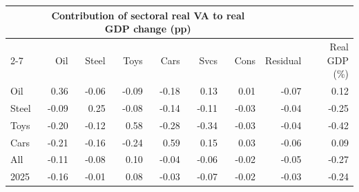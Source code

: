 \begin{tabular}{lrrrrrrrr}
\toprule
 & \multicolumn{6}{c}{Contribution of sectoral real VA to real GDP change (pp)} & & \\
\cmidrule(lr){2-7}
 & Oil & Steel & Toys & Cars & Svcs & Cons & Residual & Real GDP (\%) \\
\midrule
Oil & 0.36 & -0.06 & -0.09 & -0.18 & 0.13 & 0.01 & -0.07 & 0.12 \\
Steel & -0.09 & 0.25 & -0.08 & -0.14 & -0.11 & -0.03 & -0.04 & -0.25 \\
Toys & -0.20 & -0.12 & 0.58 & -0.28 & -0.34 & -0.03 & -0.04 & -0.42 \\
Cars & -0.21 & -0.16 & -0.24 & 0.59 & 0.15 & 0.03 & -0.06 & 0.09 \\
All & -0.11 & -0.08 & 0.10 & -0.04 & -0.06 & -0.02 & -0.05 & -0.27 \\
2025 & -0.16 & -0.01 & 0.08 & -0.03 & -0.07 & -0.02 & -0.03 & -0.24 \\
\bottomrule
\end{tabular}
